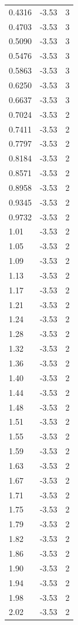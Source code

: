 \begin{longtable}{lrr}
  0.4316 & -3.53 & 3 \\
  0.4703 & -3.53 & 3 \\
  0.5090 & -3.53 & 3 \\
  0.5476 & -3.53 & 3 \\
  0.5863 & -3.53 & 3 \\
  0.6250 & -3.53 & 3 \\
  0.6637 & -3.53 & 3 \\
  0.7024 & -3.53 & 2 \\
  0.7411 & -3.53 & 2 \\
  0.7797 & -3.53 & 2 \\
  0.8184 & -3.53 & 2 \\
  0.8571 & -3.53 & 2 \\
  0.8958 & -3.53 & 2 \\
  0.9345 & -3.53 & 2 \\
  0.9732 & -3.53 & 2 \\
  1.01 & -3.53 & 2 \\
  1.05 & -3.53 & 2 \\
  1.09 & -3.53 & 2 \\
  1.13 & -3.53 & 2 \\
  1.17 & -3.53 & 2 \\
  1.21 & -3.53 & 2 \\
  1.24 & -3.53 & 2 \\
  1.28 & -3.53 & 2 \\
  1.32 & -3.53 & 2 \\
  1.36 & -3.53 & 2 \\
  1.40 & -3.53 & 2 \\
  1.44 & -3.53 & 2 \\
  1.48 & -3.53 & 2 \\
  1.51 & -3.53 & 2 \\
  1.55 & -3.53 & 2 \\
  1.59 & -3.53 & 2 \\
  1.63 & -3.53 & 2 \\
  1.67 & -3.53 & 2 \\
  1.71 & -3.53 & 2 \\
  1.75 & -3.53 & 2 \\
  1.79 & -3.53 & 2 \\
  1.82 & -3.53 & 2 \\
  1.86 & -3.53 & 2 \\
  1.90 & -3.53 & 2 \\
  1.94 & -3.53 & 2 \\
  1.98 & -3.53 & 2 \\
  2.02 & -3.53 & 2 \\

\end{longtable}
